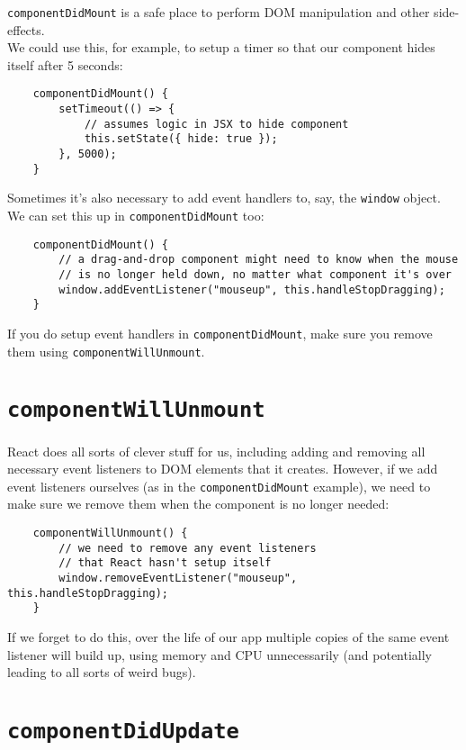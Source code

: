 \texttt{componentDidMount} is a safe place to perform DOM manipulation and other side-effects.
\\

We could use this, for example, to setup a timer so that our component hides itself after 5 seconds:

\begin{verbatim}
    componentDidMount() {
        setTimeout(() => {
            // assumes logic in JSX to hide component
            this.setState({ hide: true });
        }, 5000);
    }
\end{verbatim}

Sometimes it's also necessary to add event handlers to, say, the \texttt{window} object. We can set this up in \texttt{componentDidMount} too:

\begin{verbatim}
    componentDidMount() {
        // a drag-and-drop component might need to know when the mouse
        // is no longer held down, no matter what component it's over
        window.addEventListener("mouseup", this.handleStopDragging);
    }
\end{verbatim}

If you do setup event handlers in \texttt{componentDidMount}, make sure you remove them using \texttt{componentWillUnmount}.


\section{\texttt{componentWillUnmount}}

React does all sorts of clever stuff for us, including adding and removing all necessary event listeners to DOM elements that it creates. However, if we add event listeners ourselves (as in the \texttt{componentDidMount} example), we need to make sure we remove them when the component is no longer needed:

\begin{verbatim}
    componentWillUnmount() {
        // we need to remove any event listeners
        // that React hasn't setup itself
        window.removeEventListener("mouseup", this.handleStopDragging);
    }
\end{verbatim}

If we forget to do this, over the life of our app multiple copies of the same event listener will build up, using memory and CPU unnecessarily (and potentially leading to all sorts of weird bugs).


\section{\texttt{componentDidUpdate}}

